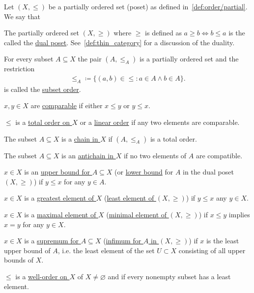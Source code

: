 \begin{definition}\label{def:poset}\cite[10]{Lectures:general_topology}
  Let $(X, \leq)$ be a partially ordered set (poset) as defined in~\cref{def:order/partial}. We say that
  \begin{defenum}
    \item\label{def:poset/dual} The partially ordered set $(X, \geq)$ where $\geq$ is defined as $a \geq b \iff b \leq a$ is the called the \uline{dual poset}. See~\cref{def:thin_category} for a discussion of the duality.

    \item\label{def:poset/subset_order} For every subset $A \subseteq X$ the pair $(A, \leq_A)$ is a partially ordered set and the restriction
    \begin{align*}
      \leq_A \coloneqq \{ (a, b) \in \leq \colon a \in A \land b \in A \}.
    \end{align*}
    is called the \uline{subset order}.

    \item\label{def:poset/comparable_elements} $x, y \in X$ are \uline{comparable} if either $x \leq y$ or $y \leq x$.
    \item\label{def:poset/total_order} $\leq$ is a \uline{total order on $X$} or a \uline{linear order} if any two elements are comparable.
    \item\label{def:poset/chain} The subset $A \subseteq X$ is a \uline{chain in $X$} if $(A, \leq_A)$ is a total order.
    \item\label{def:poset/antichain} The subset $A \subseteq X$ is an \uline{antichain in $X$} if no two elements of $A$ are compatible.
    \item\label{def:poset/upper_lower_bound} $x \in X$ is an \uline{upper bound for $A \subseteq X$} (or \uline{lower bound} for $A$ in the dual poset $(X, \geq)$) if $y \leq x$ for any $y \in A$.
    \item\label{def:poset/greatest_least_element} $x \in X$ is a \uline{greatest element of $X$} (\uline{least element of $(X, \geq)$}) if $y \leq x$ any $y \in X$.
    \item\label{def:poset/maximal_minimal_element} $x \in X$ is a \uline{maximal element of $X$} (\uline{minimal element of $(X, \geq)$}) if $x \leq y$ implies $x = y$ for any $y \in X$.
    \item\label{def:poset/supremum_infimum} $x \in X$ is a \uline{supremum for $A \subseteq X$} (\uline{infimum for $A$ in $(X, \geq)$}) if $x$ is the least upper bound of $A$, i.e. the least element of the set $U \subset X$ consisting of all upper bounds of $X$.
    \item\label{def:poset/well_order} $\leq$ is a \uline{well-order on $X$} of $X \neq \varnothing$ and if every nonempty subset has a least element.
  \end{defenum}
\end{definition}

